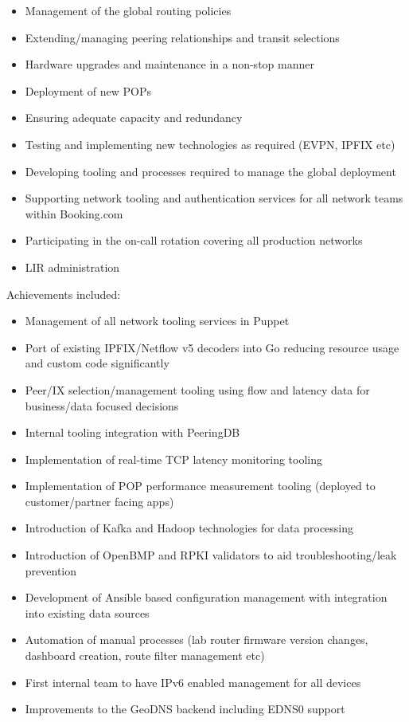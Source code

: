 \begin{itemize}
\tightlist
\item
  Management of the global routing policies
\item
  Extending/managing peering relationships and transit selections
\item
  Hardware upgrades and maintenance in a non-stop manner
\item
  Deployment of new POPs
\item
  Ensuring adequate capacity and redundancy
\item
  Testing and implementing new technologies as required (EVPN, IPFIX
  etc)
\item
  Developing tooling and processes required to manage the global
  deployment
\item
  Supporting network tooling and authentication services for all network
  teams within Booking.com
\item
  Participating in the on-call rotation covering all production networks
\item
  LIR administration
\end{itemize}

Achievements included:

\begin{itemize}
\tightlist
\item
  Management of all network tooling services in Puppet
\item
  Port of existing IPFIX/Netflow v5 decoders into Go reducing resource
  usage and custom code significantly
\item
  Peer/IX selection/management tooling using flow and latency data for
  business/data focused decisions
\item
  Internal tooling integration with PeeringDB
\item
  Implementation of real-time TCP latency monitoring tooling
\item
  Implementation of POP performance measurement tooling (deployed to
  customer/partner facing apps)
\item
  Introduction of Kafka and Hadoop technologies for data processing
\item
  Introduction of OpenBMP and RPKI validators to aid
  troubleshooting/leak prevention
\item
  Development of Ansible based configuration management with integration
  into existing data sources
\item
  Automation of manual processes (lab router firmware version changes,
  dashboard creation, route filter management etc)
\item
  First internal team to have IPv6 enabled management for all devices
\item
  Improvements to the GeoDNS backend including EDNS0 support
\end{itemize}

